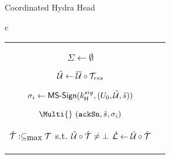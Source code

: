 \begin{figure*}[t!]
\begin{algobox}{Coordinated Hydra Head}
\begin{tabular}{c}
\begin{tabular}{c@{}c}
{\begin{walgo}{0.65}
{{               %
               $\Sigma \gets \emptyset$

               $\hat {\mathcal U} \gets \overline {\mathcal U} \circ {\mathcal T}_{res}$ \; %

               $\sigma_i \gets \mathsf{MS\textsf{-}{}Sign}(k^{sig}_\mathsf{H}, (U_{0}, \hat {\mathcal U}, \hat s))$ \; %
 
               $\Multi{}~(\hpAS,\hats,\msSig_i)$ %

                 $\hat {\mathcal T} :\subseteq_{\mbox{max}} {\mathcal T}$ s.t. $\hat {\mathcal U}\circ\hat {\mathcal T}\not=\bot$ \; %
                 $\hat {\mathcal L} \gets \hat {\mathcal U}\circ\hat {\mathcal T}$
            }
           }
          
        \end{walgo}
        }
        &

        \adjustbox{valign=t,scale=\sfact}{
        \begin{walgo}{0.6}
          \On{$(\hpAS,s,\msSig_j)$ from $\party_j$}{ %

            \Req{} $s \in \{\hats,\hats+1\} ~ \land ~ (j,\msSig_j) \notin \Sigma$
            \; %

            \Wait{$\hats=s$
            }{ %
            

            $\Sigma \gets \Sigma \cup (j,\msSig_j)$ \; %

            \If{$\forall k \in [1..n]: (k,\cdot) \in \Sigma$}{ %
              $\msCSig \gets \msComb(\msVKL, \Sigma)$ \; %

              \Req{} $\msVfy(\msCVK, (\Uinit, \hatmU, \hats), \msCSig)$ \;
              $\bars \gets \hats$ \; %
              $\barmU \gets (\hatmU, \bars, \msCSig)$ \; %



              \If{$\hats = \bars \land \hpLdr(\bars + 1) = i \land \hatmT \neq \emptyset$}{%
                \Multi{} $(\hpRS,\bars+1,\hatmT\hpProjH)$ \;%
              }
            }
          } }
        \end{walgo}

}
\end{tabular}
\end{tabular}
\end{algobox}
\end{figure*}
